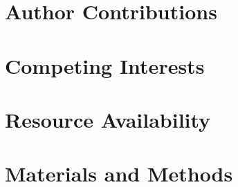 \documentclass[11pt]{elife} %
\begin{document}
\begin{fullwidth}
\section{Author Contributions}




\section{Competing Interests}




\section{Resource Availability}




\section{Materials and Methods} %




%
%


\end{fullwidth}
\end{document}
